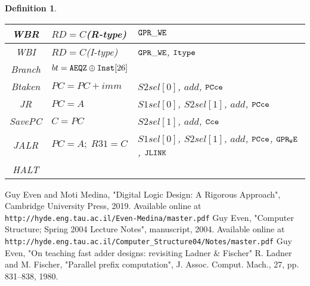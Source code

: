 \documentclass[12pt]{article}
\newtheorem{definition}[theorem]{Definition}
\begin{document}
\begin{definition}
\begin{table}[H]
\begin{tabular}{|c|p{4cm}|p{4cm}|}
      WBR & $RD = C $(R-type) & ${\tt GPR\_WE}$ \\\hline
      WBI & $RD = C $(I-type) & ${\tt GPR\_WE}$, ${\tt Itype}$\\\hline
      Branch & $bt={\tt AEQZ} \oplus {\tt Inst}[26]$ & \\\hline
      Btaken & $PC = PC + imm$ & $S2sel[0]$, $add$, ${\tt PCce}$ \\\hline
      JR & $PC = A$ & $S1sel[0]$, $S2sel[1]$, $add$, ${\tt PCce}$ \\\hline
      SavePC & $C = PC$ & $S2sel[1]$, $add$, ${\tt Cce}$ \\\hline
      JALR & $PC = A;\;R31 = C$ & $S1sel[0]$, $S2sel[1]$, $add$, ${\tt PCce}$, ${\tt GPR_WE}$, ${\tt JLINK}$ \\\hline
      HALT & & \\\hline
    \end{tabular}
  \end{table}
\end{definition}

\begin{thebibliography}{1}
   Guy Even and Moti Medina, "Digital Logic Design: A Rigorous Approach",  Cambridge University Press, 2019. Available online at \texttt{http://hyde.eng.tau.ac.il/Even-Medina/master.pdf}
   Guy Even, "Computer Structure; Spring 2004 Lecture Notes", manuscript, 2004. Available online at \texttt{http://hyde.eng.tau.ac.il/Computer\_Structure04/Notes/master.pdf}
   Guy Even, "On teaching fast adder designs: revisiting Ladner \& Fischer"
   R. Ladner and M. Fischer, "Parallel prefix computation", J. Assoc. Comput. Mach., 27, pp. 831–838, 1980.
\end{thebibliography}
\end{document}
